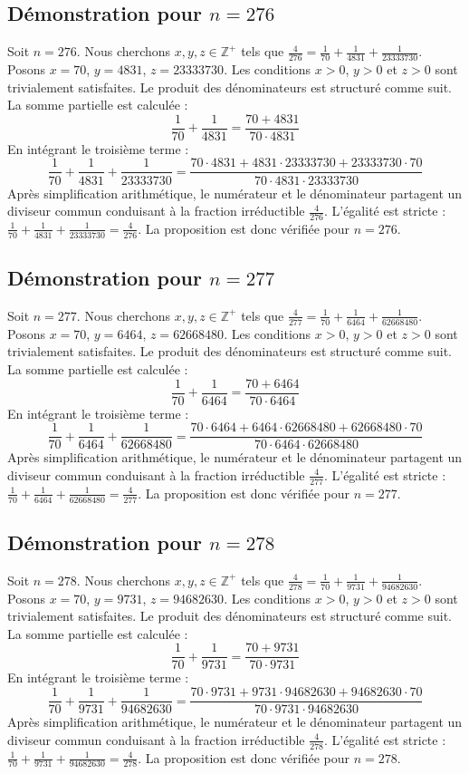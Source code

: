 \documentclass[11pt,a4paper]{article}
\begin{document}
\subsection{Démonstration pour $n = 276$}
Soit $n = 276$. Nous cherchons $x, y, z \in \mathbb{Z}^{+}$ tels que $\frac{4}{276} = \frac{1}{70} + \frac{1}{4831} + \frac{1}{23333730}$.
Posons $x = 70$, $y = 4831$, $z = 23333730$.
Les conditions $x > 0$, $y > 0$ et $z > 0$ sont trivialement satisfaites.
Le produit des dénominateurs est structuré comme suit. La somme partielle est calculée :
$$ \frac{1}{70} + \frac{1}{4831} = \frac{70+4831}{70 \cdot 4831} $$
En intégrant le troisième terme :
$$ \frac{1}{70} + \frac{1}{4831} + \frac{1}{23333730} = \frac{70 \cdot 4831 + 4831 \cdot 23333730 + 23333730 \cdot 70}{70 \cdot 4831 \cdot 23333730} $$
Après simplification arithmétique, le numérateur et le dénominateur partagent un diviseur commun conduisant à la fraction irréductible $\frac{4}{276}$.
L'égalité est stricte : $\frac{1}{70} + \frac{1}{4831} + \frac{1}{23333730} = \frac{4}{276}$.
La proposition est donc vérifiée pour $n = 276$.
\subsection{Démonstration pour $n = 277$}
Soit $n = 277$. Nous cherchons $x, y, z \in \mathbb{Z}^{+}$ tels que $\frac{4}{277} = \frac{1}{70} + \frac{1}{6464} + \frac{1}{62668480}$.
Posons $x = 70$, $y = 6464$, $z = 62668480$.
Les conditions $x > 0$, $y > 0$ et $z > 0$ sont trivialement satisfaites.
Le produit des dénominateurs est structuré comme suit. La somme partielle est calculée :
$$ \frac{1}{70} + \frac{1}{6464} = \frac{70+6464}{70 \cdot 6464} $$
En intégrant le troisième terme :
$$ \frac{1}{70} + \frac{1}{6464} + \frac{1}{62668480} = \frac{70 \cdot 6464 + 6464 \cdot 62668480 + 62668480 \cdot 70}{70 \cdot 6464 \cdot 62668480} $$
Après simplification arithmétique, le numérateur et le dénominateur partagent un diviseur commun conduisant à la fraction irréductible $\frac{4}{277}$.
L'égalité est stricte : $\frac{1}{70} + \frac{1}{6464} + \frac{1}{62668480} = \frac{4}{277}$.
La proposition est donc vérifiée pour $n = 277$.
\subsection{Démonstration pour $n = 278$}
Soit $n = 278$. Nous cherchons $x, y, z \in \mathbb{Z}^{+}$ tels que $\frac{4}{278} = \frac{1}{70} + \frac{1}{9731} + \frac{1}{94682630}$.
Posons $x = 70$, $y = 9731$, $z = 94682630$.
Les conditions $x > 0$, $y > 0$ et $z > 0$ sont trivialement satisfaites.
Le produit des dénominateurs est structuré comme suit. La somme partielle est calculée :
$$ \frac{1}{70} + \frac{1}{9731} = \frac{70+9731}{70 \cdot 9731} $$
En intégrant le troisième terme :
$$ \frac{1}{70} + \frac{1}{9731} + \frac{1}{94682630} = \frac{70 \cdot 9731 + 9731 \cdot 94682630 + 94682630 \cdot 70}{70 \cdot 9731 \cdot 94682630} $$
Après simplification arithmétique, le numérateur et le dénominateur partagent un diviseur commun conduisant à la fraction irréductible $\frac{4}{278}$.
L'égalité est stricte : $\frac{1}{70} + \frac{1}{9731} + \frac{1}{94682630} = \frac{4}{278}$.
La proposition est donc vérifiée pour $n = 278$.
\end{document}
